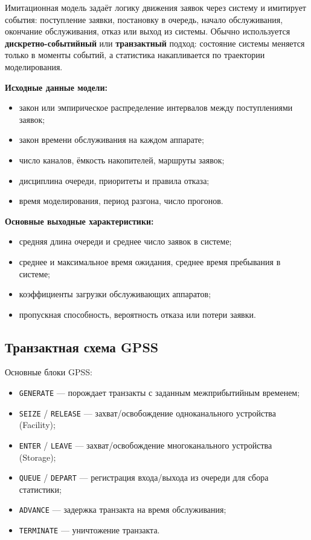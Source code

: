Имитационная модель задаёт логику движения заявок через систему и имитирует события: поступление заявки, постановку в очередь, начало обслуживания, окончание обслуживания, отказ или выход из системы. Обычно используется \textbf{дискретно-событийный} или \textbf{транзактный} подход: состояние системы меняется только в моменты событий, а статистика накапливается по траектории моделирования.

\textbf{Исходные данные модели:}
\begin{itemize}
  \item закон или эмпирическое распределение интервалов между поступлениями заявок;
  \item закон времени обслуживания на каждом аппарате;
  \item число каналов, ёмкость накопителей, маршруты заявок;
  \item дисциплина очереди, приоритеты и правила отказа;
  \item время моделирования, период разгона, число прогонов.
\end{itemize}

\textbf{Основные выходные характеристики:}
\begin{itemize}
  \item средняя длина очереди и среднее число заявок в системе;
  \item среднее и максимальное время ожидания, среднее время пребывания в системе;
  \item коэффициенты загрузки обслуживающих аппаратов;
  \item пропускная способность, вероятность отказа или потери заявки.
\end{itemize}

\subsection*{Транзактная схема GPSS}

Основные блоки GPSS:
\begin{itemize}
  \item \texttt{GENERATE} — порождает транзакты с заданным межприбытийным временем;
  \item \texttt{SEIZE} / \texttt{RELEASE} — захват/освобождение одноканального устройства (Facility);
  \item \texttt{ENTER} / \texttt{LEAVE} — захват/освобождение многоканального устройства (Storage);
  \item \texttt{QUEUE} / \texttt{DEPART} — регистрация входа/выхода из очереди для сбора статистики;
  \item \texttt{ADVANCE} — задержка транзакта на время обслуживания;
  \item \texttt{TERMINATE} — уничтожение транзакта.
\end{itemize}

